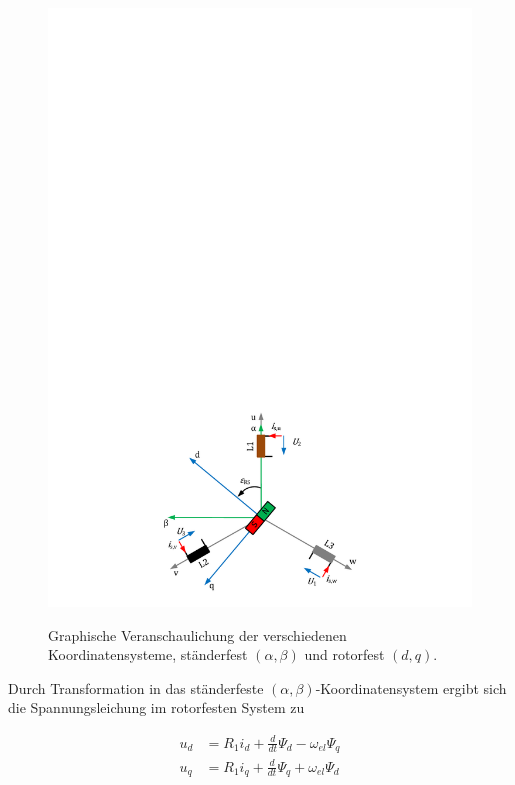\documentclass[conference,twocolumn]{IEEEtran}
\newcommand{\shortpage}{\enlargethispage{-\baselineskip}}
\begin{document}
\begin{figure}
\centering
\includegraphics[width=\columnwidth]{img/synchron-grundlage}
\label{fig:synchron-grundlage}
\caption{Graphische Veranschaulichung der verschiedenen Koordinatensysteme, ständerfest $(\alpha, \beta)$ und rotorfest $(d, q)$.}
\end{figure}

\shortpage

Durch Transformation in das ständerfeste $(\alpha, \beta)$-Koordinatensystem ergibt sich die Spannungsleichung im rotorfesten System zu

\begin{align}
u_d &= R_1 i_d + \frac{d}{dt}\Psi_d - \omega_{el} \Psi_q \label{eqn:ud} \\ 
u_q &= R_1 i_q + \frac{d}{dt}\Psi_q + \omega_{el} \Psi_d \label{eqn:uq}
\end{align}
\end{document}
